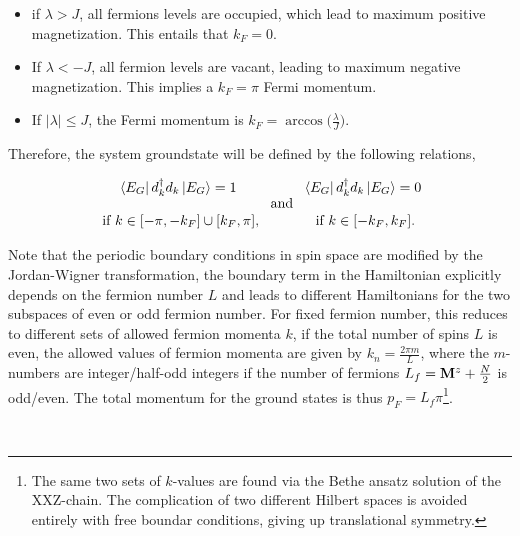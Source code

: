 \documentclass{homework}
\begin{document}
\begin{itemize}
    \item if $\lambda > J$, all fermions levels are occupied, which lead to maximum positive magnetization. This entails that $k_F = 0$.
    \item If $\lambda < -J$, all fermion levels are vacant, leading to maximum negative magnetization. This implies a $k_F = \pi$ Fermi momentum.
    \item If $|\lambda| \leq J$, the Fermi momentum is $k_F = \arccos \bigg(\frac{\lambda}{J}\bigg)$.
\end{itemize}

Therefore, the system groundstate will be defined by the following relations, 

\begin{equation}
    \begin{array}{c}
         \bra{E_G} d_k^\dagger d_k \ket{E_G} = 1  \\
         \\
         \textnormal{ if } k \in [-\pi, -k_F] \cup [k_F, \pi],
    \end{array} \textnormal{ and }  \begin{array}{c}
         \bra{E_G} d_k^\dagger d_k \ket{E_G} = 0  \\
         \\
         \textnormal{ if } k \in [-k_F, k_F].
    \end{array}
\end{equation}

Note that the periodic boundary conditions in spin space are modified by the Jordan-Wigner transformation, the boundary term in the Hamiltonian explicitly depends on the fermion number $L$ and leads to different Hamiltonians for the two subspaces of even or odd fermion number. For fixed fermion number, this reduces to different sets of allowed fermion momenta $k$, if the total number of spins $L$ is even, the allowed values of fermion momenta are given by $k_n = \frac{2 \pi m}{L}$, where the $m$-numbers are integer/half-odd integers if the number of fermions $L_f = {\bf M}^z + \frac{N}{2}$ is odd/even. The total momentum for the ground states is thus $p_F = L_f \pi$\footnote{The same two sets of $k$-values are found via the Bethe ansatz solution of the XXZ-chain. The complication of two different Hilbert spaces is avoided entirely with free boundar conditions, giving up translational symmetry.}.

\blanky \\
\end{document}
